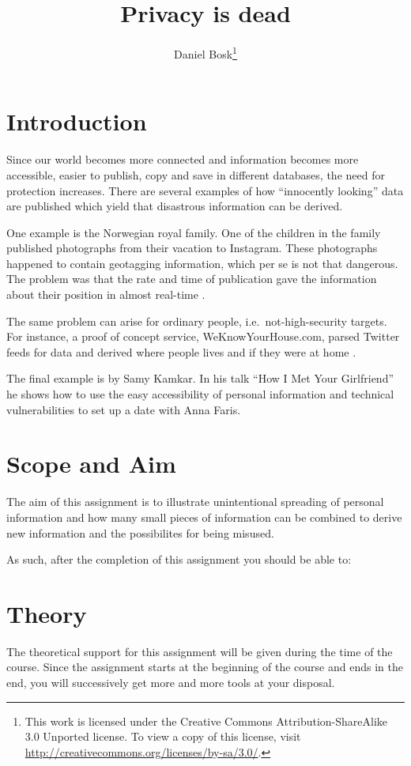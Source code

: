 \documentclass[a4paper,nocourse]{miunasgn}
\title{Privacy is dead}
\author{Daniel Bosk\footnote{%
  This work is licensed under the Creative Commons Attribution-ShareAlike 3.0 
  Unported license.
	To view a copy of this license, visit 
	\url{http://creativecommons.org/licenses/by-sa/3.0/}.
}}
\date{\svnId}
\begin{document}
\maketitle
\thispagestyle{foot}
\tableofcontents


\section{Introduction}
\label{sec:introduction}
Since our world becomes more connected and information becomes more accessible, 
easier to publish, copy and save in different databases, the need for 
protection increases.
There are several examples of how ``innocently looking'' data are published 
which yield that disastrous information can be derived.

One example is the Norwegian royal family.
One of the children in the family published photographs from their vacation to 
Instagram.
These photographs happened to contain geotagging information, which per se is 
not that dangerous.
The problem was that the rate and time of publication gave the information 
about their position in almost real-time \cite{Roberts2012wia}.

The same problem can arise for ordinary people, i.e.\ not-high-security 
targets.
For instance, a proof of concept service, WeKnowYourHouse.com, parsed Twitter 
feeds for data and derived where people lives and if they were at home 
\cite{Brading2012tpl}.

The final example is by Samy Kamkar.
In his talk ``How I Met Your Girlfriend'' \cite{Kamkar2010him} he shows how to 
use the easy accessibility of personal information and technical 
vulnerabilities to set up a date with Anna Faris.


\section{Scope and Aim}
\label{sec:aim}
The aim of this assignment is to illustrate unintentional spreading of personal 
information and how many small pieces of information can be combined to derive 
new information and the possibilites for being misused.

As such, after the completion of this assignment you should be able to:
\begin{itemize}
	
\end{itemize}


\section{Theory}
\label{sec:theory}
The theoretical support for this assignment will be given during the time of 
the course.
Since the assignment starts at the beginning of the course and ends in the end, 
you will successively get more and more tools at your disposal.
\end{document}
